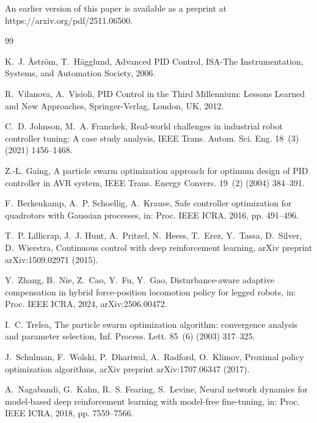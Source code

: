 \documentclass[DTMColor]{ROB-New}
\begin{document}
\noindent
An earlier version of this paper is available as a preprint at https://arxiv.org/pdf/2511.06500.




\begin{thebibliography}{99}

K.~J. Åström, T.~Hägglund, Advanced PID Control, ISA-The Instrumentation, Systems, and Automation Society, 2006.

R.~Vilanova, A.~Visioli, PID Control in the Third Millennium: Lessons Learned and New Approaches, Springer-Verlag, London, UK, 2012.

C.~D. Johnson, M.~A. Franchek, Real-world challenges in industrial robot controller tuning: A case study analysis, IEEE Trans. Autom. Sci. Eng. 18~(3) (2021) 1456--1468.

Z.-L. Gaing, A particle swarm optimization approach for optimum design of PID controller in AVR system, IEEE Trans. Energy Convers. 19~(2) (2004) 384--391.

F.~Berkenkamp, A.~P. Schoellig, A.~Krause, Safe controller optimization for quadrotors with Gaussian processes, in: Proc. IEEE ICRA, 2016, pp. 491--496.

T.~P. Lillicrap, J.~J. Hunt, A.~Pritzel, N.~Heess, T.~Erez, Y.~Tassa, D.~Silver, D.~Wierstra, Continuous control with deep reinforcement learning, arXiv preprint arXiv:1509.02971 (2015).

Y.~Zhang, B.~Nie, Z.~Cao, Y.~Fu, Y.~Gao, Disturbance-aware adaptive compensation in hybrid force-position locomotion policy for legged robots, in: Proc. IEEE ICRA, 2024, arXiv:2506.00472.

I.~C. Trelea, The particle swarm optimization algorithm: convergence analysis and parameter selection, Inf. Process. Lett. 85~(6) (2003) 317--325.

J.~Schulman, F.~Wolski, P.~Dhariwal, A.~Radford, O.~Klimov, Proximal policy optimization algorithms, arXiv preprint arXiv:1707.06347 (2017).

A.~Nagabandi, G.~Kahn, R.~S. Fearing, S.~Levine, Neural network dynamics for model-based deep reinforcement learning with model-free fine-tuning, in: Proc. IEEE ICRA, 2018, pp. 7559--7566.


\end{thebibliography}
\end{document}
